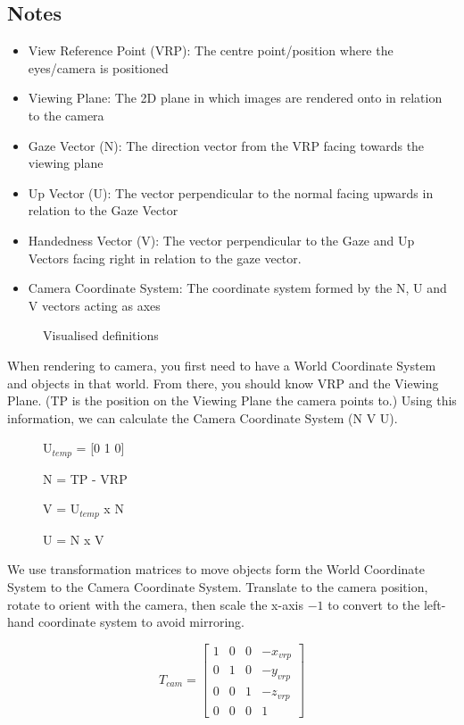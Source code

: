 \subsection{Notes}
\begin{itemize}
	\item View Reference Point (VRP): The centre point/position where the eyes/camera is positioned
	\item Viewing Plane: The 2D plane in which images are rendered onto in relation to the camera
	\item Gaze Vector (N): The direction vector from the VRP facing towards the viewing plane
	\item Up Vector (U): The vector perpendicular to the normal facing upwards in relation to the Gaze Vector
	\item Handedness Vector (V): The vector perpendicular to the Gaze and Up Vectors facing right in relation to the gaze vector.
	\item Camera Coordinate System: The coordinate system formed by the N, U and V vectors acting as axes
\end{itemize}
  \begin{figure}[!htb]
	\caption{\label{fig:camDefs} Visualised definitions}
\end{figure}
When rendering to camera, you first need to have a World Coordinate System and objects in that world. From there, you should know VRP and the Viewing Plane. (TP is the position on the Viewing Plane the camera points to.) Using this information, we can calculate the Camera Coordinate System (N V U).
\begin{figure}[!htb]
	\centering
	U$_{temp}$ = [0 1 0]
		
	N = TP - VRP
	
	V = U$_{temp}$ x N
	
	U = N x V
\end{figure}

We use transformation matrices to move objects form the World Coordinate System to the Camera Coordinate System. Translate to the camera position, rotate to orient with the camera, then scale the x-axis $-1$ to convert to the left-hand coordinate system to avoid mirroring.

\begin{equation}
\label{eqn:tanslateCam}
T_{cam} =\begin{bmatrix}
1 & 0 & 0 & -x_{vrp}\\ 
0 & 1 & 0 & -y_{vrp}\\ 
0 & 0 & 1 & -z_{vrp}\\
0 & 0 & 0 & 1 
\end{bmatrix}
\end{equation}

